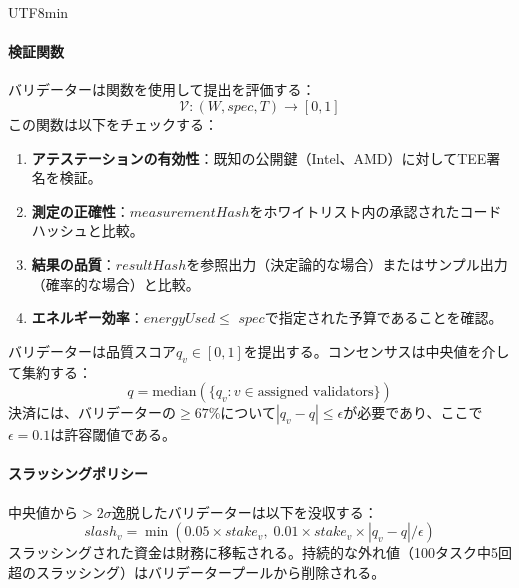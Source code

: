 \documentclass[11pt]{article}
\begin{document}
\begin{CJK}{UTF8}{min}
\paragraph{検証関数} バリデーターは関数を使用して提出を評価する：
\begin{equation}
\mathcal{V}: (W, spec, T) \rightarrow [0, 1]
\end{equation}
この関数は以下をチェックする：
\begin{enumerate}[noitemsep]
  \item \textbf{アテステーションの有効性}：既知の公開鍵（Intel、AMD）に対してTEE署名を検証。
  \item \textbf{測定の正確性}：$measurementHash$をホワイトリスト内の承認されたコードハッシュと比較。
  \item \textbf{結果の品質}：$resultHash$を参照出力（決定論的な場合）またはサンプル出力（確率的な場合）と比較。
  \item \textbf{エネルギー効率}：$energyUsed \leq$ $spec$で指定された予算であることを確認。
\end{enumerate}
バリデーターは品質スコア$q_v \in [0,1]$を提出する。コンセンサスは中央値を介して集約する：
\begin{equation}
q = \text{median}(\{q_v : v \in \text{assigned validators}\})
\end{equation}
決済には、バリデーターの$\geq 67\%$について$|q_v - q| \leq \epsilon$が必要であり、ここで$\epsilon = 0.1$は許容閾値である。

\paragraph{スラッシングポリシー} 中央値から$>2\sigma$逸脱したバリデーターは以下を没収する：
\begin{equation}
slash_v = \min(0.05 \times stake_v, \; 0.01 \times stake_v \times |q_v - q| / \epsilon)
\end{equation}
スラッシングされた資金は財務に移転される。持続的な外れ値（100タスク中5回超のスラッシング）はバリデータープールから削除される。


\end{CJK}
\end{document}
